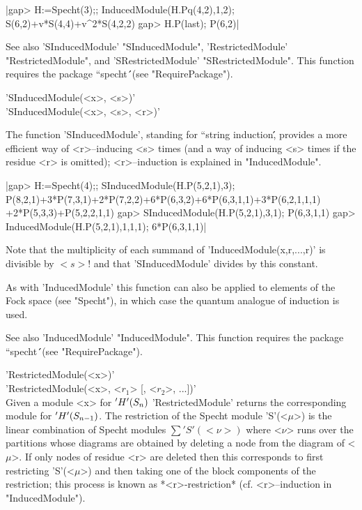 |gap> H:=Specht(3);; InducedModule(H.Pq(4,2),1,2);
S(6,2)+v*S(4,4)+v^2*S(4,2,2)
gap> H.P(last);
P(6,2)|

See also 'SInducedModule' "SInducedModule", 'RestrictedModule' 
"RestrictedModule", and 'SRestrictedModule' "SRestrictedModule". This 
function requires the package ``specht\'\'\ (see "RequirePackage").



'SInducedModule(<x>, <s>)'\\
'SInducedModule(<x>, <s>, <r>)'

The function 'SInducedModule', standing for ``string induction\'\', 
provides a more efficient way of <r>--inducing <s> times (and a way of 
inducing <s> times if the residue <r> is omitted); <r>--induction is 
explained in "InducedModule".

|gap> H:=Specht(4);; SInducedModule(H.P(5,2,1),3);
P(8,2,1)+3*P(7,3,1)+2*P(7,2,2)+6*P(6,3,2)+6*P(6,3,1,1)+3*P(6,2,1,1,1)
+2*P(5,3,3)+P(5,2,2,1,1)
gap> SInducedModule(H.P(5,2,1),3,1);
P(6,3,1,1)
gap> InducedModule(H.P(5,2,1),1,1,1);
6*P(6,3,1,1)|

Note that the multiplicity of each summand of 'InducedModule(x,r,...,r)' 
is divisible by $<s>!$ and that 'SInducedModule' divides by this constant.

As with 'InducedModule' this function can also be applied to elements of 
the Fock space (see "Specht"), in which case the quantum analogue of 
induction is used.

See also 'InducedModule' "InducedModule". This function requires the 
package ``specht\'\'\ (see "RequirePackage").



'RestrictedModule(<x>)'\\
'RestrictedModule(<x>, <$r_1$> [, <$r_2$>, ...])'\\

Given a module <x> for $'H'(S_n)$ 'RestrictedModule' returns the 
corresponding module for $'H'(S_{n-1})$.  The restriction of the Specht
module 'S'(<$\mu$>) is the linear combination of Specht modules 
                    $\sum 'S'(<\nu>)$ 
where <$\nu$> runs over the partitions whose diagrams are obtained by 
deleting a node from the diagram of <$\mu$>. If only nodes of residue <r> 
are deleted then this corresponds to first restricting 'S'(<$\mu$>) and 
then taking one of the block components of the restriction; this process 
is known as *<r>-restriction* (cf. <r>--induction in "InducedModule"). 

